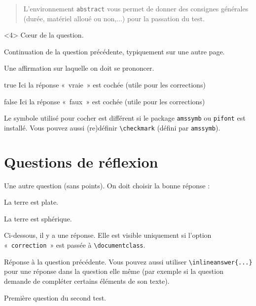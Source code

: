\documentclass[12pt,a4paper, rulers]{tests}
\begin{document}
\begin{abstract}
  L'environnement \verb+abstract+ vous permet de donner des
  consignes générales (durée, matériel alloué ou non,...) pour la
  passation du test.
\end{abstract}


\begin{question}<4>
  Cœur de la question.
\end{question}

\begin{question*}
  Continuation de la question précédente, typiquement sur une autre
  page.
\end{question*}


\begin{question}
  \begin{TrueFalse}
  \item Une affirmation sur laquelle on doit se prononcer.
  \item[true] Ici la réponse «~vraie~» est cochée (utile pour les
    corrections)
  \item[false] Ici la réponse «~faux~» est cochée (utile pour les
    corrections)
  \end{TrueFalse}
  Le symbole utilisé pour cocher est différent si le package
  \verb+amssymb+ ou \verb+pifont+ est installé.  Vous pouvez aussi
  (re)définir \verb+\checkmark+ (défini par \verb+amssymb+).
\end{question}

\newpage

\part{Questions de réflexion}

\begin{question}
  Une autre question (sans points).  On doit choisir la bonne réponse :
  \begin{TrueFalse*}
  \item La terre est plate.
  \item La terre est sphérique.
  \end{TrueFalse*}
\end{question}

Ci-dessous, il y a une réponse.  Elle est visible uniquement si
l'option «~\verb+correction+~» est passée à \verb+\documentclass+.
\begin{answer}
  Réponse à la question précédente.  Vous pouvez aussi utiliser
  \verb+\inlineanswer{...}+ pour une réponse dans la question elle
  même (par exemple si la question demande de compléter certains
  éléments de son texte).
\end{answer}

\exam
{}
\maketitle %

\begin{question}
  Première question du second test.
\end{question}
\end{document}

